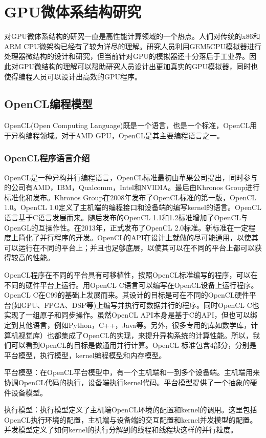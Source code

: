 \chapter{GPU微体系结构研究}\label{chap:GPUArch}
对GPU微体系结构的研究一直是高性能计算领域的一个热点。人们对传统的x86和ARM CPU微架构已经有了较为详尽的理解。研究人员利用GEM5CPU模拟器进行处理器微结构的设计和研究，但当前针对GPU的模拟器还十分落后于工业界。因此对GPU微结构的理解可以帮助研究人员设计出更加真实的GPU模拟器，同时也使得编程人员可以设计出高效的GPU程序。
\section{OpenCL编程模型}
OpenCL(Open Computing Language)既是一个语言，也是一个标准，OpenCL用于异构编程领域。对于AMD GPU，OpenCL是其主要编程语言之一。

\subsection{OpenCL程序语言介绍}
OpenCL是一种异构并行编程语言，OpenCL标准最初由苹果公司提出，同时参与的公司有AMD，IBM，Qualcomm，Intel和NVIDIA。最后由Khronos Group进行标准化和发布。Khronos Group在2008年发布了OpenCL标准的第一版，OpenCL 1.0。OpenCL 1.0定义了主机端的编程接口和设备端的编写kernel的语言。OpenCL语言基于C语言发展而来。随后发布的OpenCL 1.1和1.2标准增加了OpenCL与OpenGL的互操作性。在2013年，正式发布了OpenCL 2.0标准。新标准在一定程度上简化了并行程序的开发。OpenCL的API在设计上就做的尽可能通用，以使其可以运行在不同的平台上；并且也足够底层，以使其可以在不同的平台上都可以获得较高的性能。

OpenCL程序在不同的平台具有可移植性，按照OpenCL标准编写的程序，可以在不同的硬件平台上运行。用OpenCL C语言可以编写在OpenCL设备上运行程序。OpenCL C在C99的基础上发展而来。其设计的目标是可在不同的OpenCL硬件平台(如GPU、FPGA、DSP等)上编写并执行可数据并行的程序。同时OpenCL C也实现了一组原子和同步操作。虽然OpenCL API本身是基于C的API，但也可以绑定到其他语言，例如Python，C++，Java等。另外，很多专用的库如数学库，计算机视觉库）也都集成了OpenCL的实现，来提升异构系统的计算性能。所以，我们可以看到OpenCL的目标是做通用并行计算。OpenCL 标准包含4部分，分别是平台模型，执行模型，kernel编程模型和内存模型。

平台模型：在OpenCL平台模型中，有一个主机端和一到多个设备端。主机端用来协调OpenCL代码的执行，设备端执行kernel代码。平台模型提供了一个抽象的硬件设备模型。

执行模型：执行模型定义了主机端OpenCL环境的配置和kernel的调用。这里包括OpenCL执行环境的配置，主机端与设备端的交互配置和kernel并发模型的配置。并发模型定义了如何kernel的执行分解到的线程和线程块这样的并行粒度。

